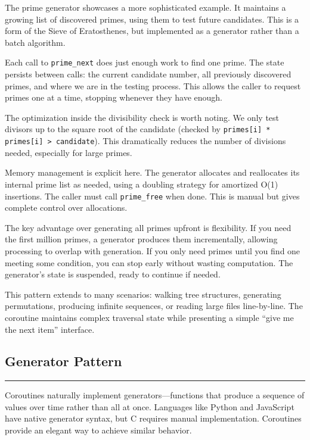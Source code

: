 The prime generator showcases a more sophisticated example. It maintains a growing list of discovered primes, using them to test future candidates. This is a form of the Sieve of Eratosthenes, but implemented as a generator rather than a batch algorithm.

Each call to \texttt{prime\_next} does just enough work to find one prime. The state persists between calls: the current candidate number, all previously discovered primes, and where we are in the testing process. This allows the caller to request primes one at a time, stopping whenever they have enough.

The optimization inside the divisibility check is worth noting. We only test divisors up to the square root of the candidate (checked by \texttt{primes[i] * primes[i] > candidate}). This dramatically reduces the number of divisions needed, especially for large primes.

Memory management is explicit here. The generator allocates and reallocates its internal prime list as needed, using a doubling strategy for amortized O(1) insertions. The caller must call \texttt{prime\_free} when done. This is manual but gives complete control over allocations.

The key advantage over generating all primes upfront is flexibility. If you need the first million primes, a generator produces them incrementally, allowing processing to overlap with generation. If you only need primes until you find one meeting some condition, you can stop early without wasting computation. The generator's state is suspended, ready to continue if needed.

This pattern extends to many scenarios: walking tree structures, generating permutations, producing infinite sequences, or reading large files line-by-line. The coroutine maintains complex traversal state while presenting a simple ``give me the next item'' interface.

\vspace{0.5cm}
\subsection{Generator Pattern}

\noindent\rule{\textwidth}{0.4pt}
\vspace{0.2cm}

Coroutines naturally implement generators---functions that produce a sequence of values over time rather than all at once. Languages like Python and JavaScript have native generator syntax, but C requires manual implementation. Coroutines provide an elegant way to achieve similar behavior.


